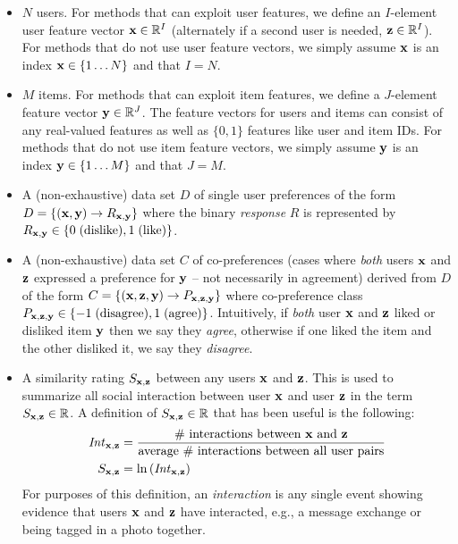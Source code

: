 \begin{itemize}
\item $N$ users.  For methods that can exploit user features, we define 
an $I$-element user feature vector 
$\mathbf{x} \in \mathbb{R}^I$ (alternately if a second user is needed, $\mathbf{z} \in \mathbb{R}^I$).
For methods that do not use user feature vectors, we simply assume $\mathbf{x}$
is an index $\mathbf{x} \in \{ 1 \ldots N \}$ and that $I=N$.

\item $M$ items.  For methods that can exploit item features, we define
a $J$-element feature vector 
$\mathbf{y} \in \mathbb{R}^J$. The feature vectors for users 
and items can consist of any real-valued features as well as $\{0,1\}$
features like user and item IDs.
For methods that do not use item feature vectors, we simply assume $\mathbf{y}$
is an index $\mathbf{y} \in \{ 1 \ldots M \}$ and that $J=M$.

\item A (non-exhaustive) data set $D$ of single user preferences of the form
$D = \{ (\mathbf{x}, \mathbf{y}) \to R_{\mathbf{x},\mathbf{y}} \}$ where 
the binary \emph{response} $R$ is represented by 
$R_{\mathbf{x},\mathbf{y}} \in \{ 0 \; \mbox{(dislike)}, 1 \; \mbox{(like)} \}$.

\item A (non-exhaustive) data set $C$ of co-preferences (cases where
\emph{both} users $\mathbf{x}$ and $\mathbf{z}$ expressed a preference for $\mathbf{y}$ -- not
necessarily in agreement) derived from $D$ of the form
$C = \{ (\mathbf{x}, \mathbf{z}, \mathbf{y}) \to P_{\mathbf{x}, \mathbf{z}, \mathbf{y}} \}$ where co-preference class 
$P_{\mathbf{x}, \mathbf{z}, \mathbf{y}} \in \{ -1 \; \mbox{(disagree)}, 1 \;\mbox{(agree)} \}$.  
Intuitively, if \emph{both} user $\mathbf{x}$ and $\mathbf{z}$ liked or disliked item 
$\mathbf{y}$ then we say they \emph{agree}, otherwise if one liked the item and
the other disliked it, we say they \emph{disagree}.

\item A similarity rating $S_{\mathbf{x},\mathbf{z}}$ between any users $\mathbf{x}$ and $\mathbf{z}$. This is used to summarize all social
interaction between user $\mathbf{x}$ and user $\mathbf{z}$ in the term $S_{\mathbf{x},\mathbf{z}} \in
\mathbb{R}$.  A definition of $S_{\mathbf{x},\mathbf{z}} \in \mathbb{R}$ that has been useful is the
following:
\begin{align}
\mathit{Int}_{\mathbf{x},\mathbf{z}} & = \frac{\mbox{\# interactions between $\mathbf{x}$
and $\mathbf{z}$}}{\mbox{average \# interactions between all user pairs}}\\
S_{\mathbf{x},\mathbf{z}} & = \ln \left( \mathit{Int}_{\mathbf{x},\mathbf{z}} \right)
\end{align}
For purposes of this definition, an \emph{interaction} is any single event
showing evidence that users $\mathbf{x}$ and $\mathbf{z}$ have 
interacted, e.g., a message exchange or being tagged in a photo together.


\end{itemize}
